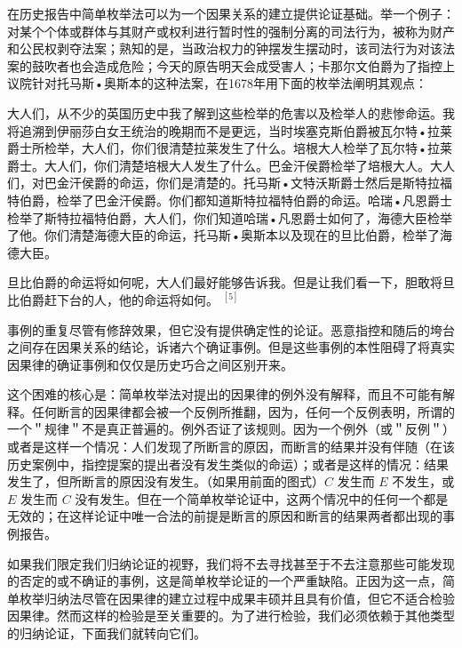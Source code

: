 在历史报告中简单枚举法可以为一个因果关系的建立提供论证基础。举一个例子：对某个个体或群体与其财产或权利进行暂时性的强制分离的司法行为，被称为财产和公民权剥夺法案；熟知的是，当政治权力的钟摆发生摆动时，该司法行为对该法案的鼓吹者也会造成危险；今天的原告明天会成受害人；卡那尔文伯爵为了指控上议院针对托马斯•奥斯本的这种法案，在1678年用下面的枚举法阐明其观点：

大人们，从不少的英国历史中我了解到这些检举的危害以及检举人的悲惨命运。我将追溯到伊丽莎白女王统治的晚期而不是更远，当时埃塞克斯伯爵被瓦尔特•拉莱爵士所检举，大人们，你们很清楚拉莱发生了什么。培根大人检举了瓦尔特•拉莱爵士。大人们，你们清楚培根大人发生了什么。巴金汗侯爵检举了培根大人。大人们，对巴金汗侯爵的命运，你们是清楚的。托马斯•文特沃斯爵士然后是斯特拉福特伯爵，检举了巴金汗侯爵。你们都知道斯特拉福特伯爵的命运。哈瑞•凡恩爵士检举了斯特拉福特伯爵，大人们，你们知道哈瑞•凡恩爵士如何了，海德大臣检举了他。你们清楚海德大臣的命运，托马斯•奥斯本以及现在的旦比伯爵，检举了海德大臣。

旦比伯爵的命运将如何呢，大人们最好能够告诉我。但是让我们看一下，胆敢将旦比伯爵赶下台的人，他的命运将如何。 ${ }^{[5]}$

事例的重复尽管有修辞效果，但它没有提供确定性的论证。恶意指控和随后的垮台之间存在因果关系的结论，诉诸六个确证事例。但是这些事例的本性阻碍了将真实因果律的确证事例和仅仅是历史巧合之间区别开来。

这个困难的核心是：简单枚举法对提出的因果律的例外没有解释，而且不可能有解释。任何断言的因果律都会被一个反例所推翻，因为，任何一个反例表明，所谓的一个＂规律＂不是真正普遍的。例外否证了该规则。因为一个例外（或＂反例＂）或者是这样一个情况：人们发现了所断言的原因，而断言的结果并没有伴随（在该历史案例中，指控提案的提出者没有发生类似的命运）；或者是这样的情况：结果发生了，但所断言的原因没有发生。（如果用前面的图式）$C$ 发生而 $E$ 不发生，或 $E$ 发生而 $C$ 没有发生。但在一个简单枚举论证中，这两个情况中的任何一个都是无效的；在这样论证中唯一合法的前提是断言的原因和断言的结果两者都出现的事例报告。

如果我们限定我们归纳论证的视野，我们将不去寻找甚至于不去注意那些可能发现的否定的或不确证的事例，这是简单枚举论证的一个严重缺陷。正因为这一点，简单枚举归纳法尽管在因果律的建立过程中成果丰硕并且具有价值，但它不适合检验因果律。然而这样的检验是至关重要的。为了进行检验，我们必须依赖于其他类型的归纳论证，下面我们就转向它们。 


